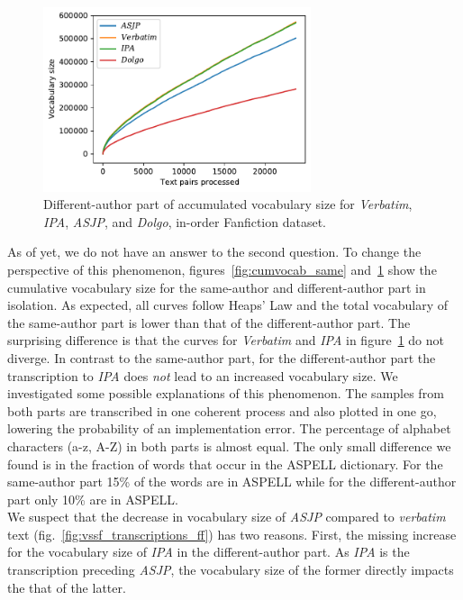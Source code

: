 \begin{figure}
  \centering
  \includegraphics[width=0.7\textwidth]{figures/cum_vocab_size_ff_inorder_onlydiff_ipa}
  \caption{Different-author part of accumulated vocabulary size for \textit{Verbatim}, \textit{IPA}, \textit{ASJP}, and \textit{Dolgo}, in-order Fanfiction dataset.}
  \label{fig:cumvocab_diff}
\end{figure}
As of yet, we do not have an answer to the second question.
To change the perspective of this phenomenon, figures~\ref{fig:cumvocab_same} and~\ref{fig:cumvocab_diff} show the cumulative vocabulary size for the same-author and different-author part in isolation.
As expected, all curves follow Heaps' Law and the total vocabulary of the same-author part is lower than that of the different-author part.
The surprising difference is that the curves for \textit{Verbatim} and \textit{IPA} in figure~\ref{fig:cumvocab_diff} do not diverge.
In contrast to the same-author part, for the different-author part the transcription to \textit{IPA} does \textit{not} lead to an increased vocabulary size.
We investigated some possible explanations of this phenomenon.
The samples from both parts are transcribed in one coherent process and also plotted in one go, lowering the probability of an implementation error.
The percentage of alphabet characters (a-z, A-Z) in both parts is almost equal.
The only small difference we found is in the fraction of words that occur in the ASPELL dictionary.
For the same-author part 15\% of the words are in ASPELL while for the different-author part only 10\% are in ASPELL\@.\\
We suspect that the decrease in vocabulary size of \textit{ASJP} compared to \textit{verbatim} text (fig.~\ref{fig:vssf_transcriptions_ff}) has two reasons.
First, the missing increase for the vocabulary size of \textit{IPA} in the different-author part.
As \textit{IPA} is the transcription preceding \textit{ASJP}, the vocabulary size of the former directly impacts the that of the latter.
